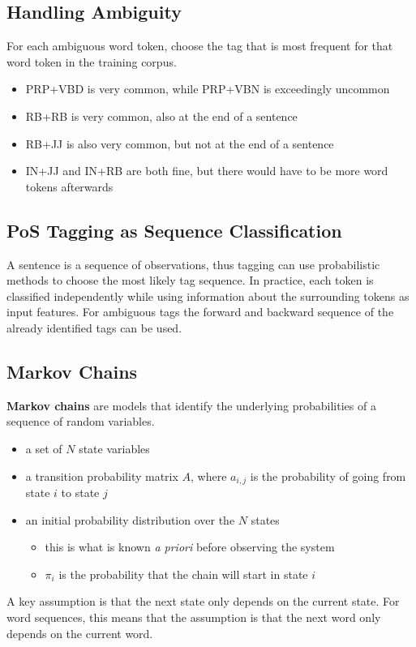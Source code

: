 \documentclass[11pt]{article}
\begin{document}
\subsection{Handling Ambiguity}
For each ambiguous word token, choose the tag that is most frequent for that word token in the training corpus.
\begin{itemize}
	\item PRP+VBD is very common, while PRP+VBN is exceedingly uncommon
	\item RB+RB is very common, also at the end of a sentence
	\item RB+JJ is also very common, but not at the end of a sentence
	\item IN+JJ and IN+RB are both fine, but there would have to be more word tokens afterwards
\end{itemize}

\subsection{PoS Tagging as Sequence Classification}
A sentence is a sequence of observations, thus tagging can use probabilistic methods to choose the most likely tag sequence. In practice, each token is classified independently while using information about the surrounding tokens as input features. For ambiguous tags the forward and backward sequence of the already identified tags can be used.

\subsection{Markov Chains}
\textbf{Markov chains} are models that identify the underlying probabilities of a sequence of random variables.
\begin{itemize}
	\item a set of $N$ state variables
	\item a transition probability matrix $A$, where $a_{i,j}$ is the probability of going from state $i$ to state $j$
	\item an initial probability distribution over the $N$ states
	\begin{itemize}
		\item this is what is known \emph{a priori} before observing the system
		\item $\pi_i$ is the probability that the chain will start in state $i$
	\end{itemize}
\end{itemize}
A key assumption is that the next state only depends on the current state. For word sequences, this means that the assumption is that the next word only depends on the current word.
\end{document}
